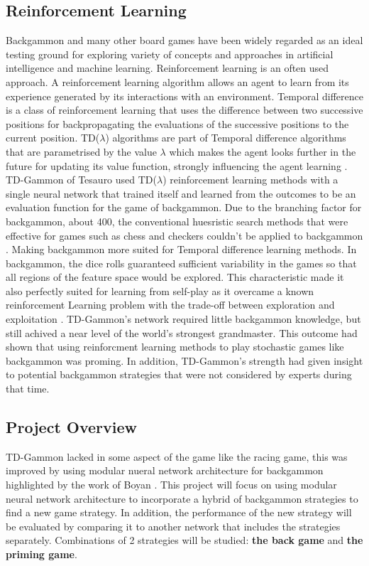 \documentclass[12pt,a4paper]{article}
\begin{document}
\subsection{Reinforcement Learning}
Backgammon and many other board games have been widely regarded as an ideal testing ground for exploring variety of concepts and approaches in artificial intelligence and machine learning. Reinforcement learning is an often used approach. A reinforcement learning algorithm allows an agent to learn from its experience generated by its interactions with an environment. Temporal difference is a class of reinforcement learning that uses the difference between two successive positions for backpropagating the evaluations of the successive positions to the current position. TD($\lambda$) algorithms are part of Temporal difference algorithms that are parametrised by the value $\lambda$ which makes the agent looks further in the future for updating its value function, strongly influencing the agent learning \cite{rl}. TD-Gammon of Tesauro \citeyear{DBLP:conf/icml/Tesauro92} used TD($\lambda$) reinforcement learning methods with a single neural network that trained itself and learned from the outcomes to be an evaluation function for the game of backgammon. Due to the branching factor for backgammon, about 400, the conventional huesristic search methods that were effective for games such as chess and checkers couldn't be applied to backgammon \cite{rl}. Making backgammon more suited for Temporal difference learning methods. In backgammon, the dice rolls guaranteed sufficient variability in the games so that all regions of the feature space would be explored. This characteristic made it also perfectly suited for learning from self-play as it overcame a known reinforcement Learning problem with the trade-off between exploration and exploitation \cite{survey}. TD-Gammon's network required little backgammon knowledge, but still achived a near level of the world's strongest grandmaster. This outcome had shown that using reinforcment learning methods to play stochastic games like backgammon was proming. In addition, TD-Gammon's strength had given insight to potential backgammon strategies that were not considered by experts during that time. 

\subsection{Project Overview}
TD-Gammon lacked in some aspect of the game like the racing game, this was improved by using modular nueral network architecture for backgammon highlighted by the work of Boyan \citeyear{boyan}. This project will focus on using modular neural network architecture to incorporate a hybrid of backgammon strategies to find a new game strategy. In addition, the performance of the new strategy will be evaluated by comparing it to another network that includes the strategies separately. Combinations of 2 strategies will be studied: \textbf{the back game} and \textbf{the priming game}.
\end{document}
